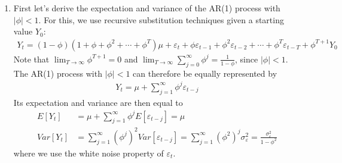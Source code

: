 \begin{enumerate}
\item First let's derive the expectation and variance of the AR(1) process with \(|\phi|<1\).
For this, we use recursive substitution techniques given a starting value \(Y_0\):
\begin{align*}
Y_t = (1-\phi)(1+\phi+\phi^2+\cdots+\phi^T)\mu + \varepsilon_t + \phi \varepsilon_{t-1} + \phi^2 \varepsilon_{t-2} + \cdots + \phi^T \varepsilon_{t-T} + \phi^{T+1} Y_0
\end{align*}
Note that \(\lim_{T\rightarrow \infty} \phi^{T+1} = 0\)
  and \(\lim_{T\rightarrow \infty} \sum_{j=0}^\infty \phi^j = \frac{1}{1-\phi}\), since $|\phi|<1$.
The AR(1) process with \(|\phi|<1\) can therefore be equally represented by
\begin{align*}
Y_t = \mu + \sum_{j=1}^\infty \phi^j \varepsilon_{t-j}
\end{align*}
Its expectation and variance are then equal to
\begin{align*}
E[Y_t] &= \mu + \sum_{j=1}^\infty \phi^j E[\varepsilon_{t-j}] = \mu\\
Var[Y_t] &= \sum_{j=1}^\infty (\phi^j)^2 Var[\varepsilon_{t-j}] = \sum_{j=1}^\infty (\phi^2)^j \sigma_\varepsilon^2 = \frac{\sigma_\varepsilon^2}{1-\phi^2}
\end{align*}
where we use the white noise property of \(\varepsilon_t\).


\end{enumerate}
